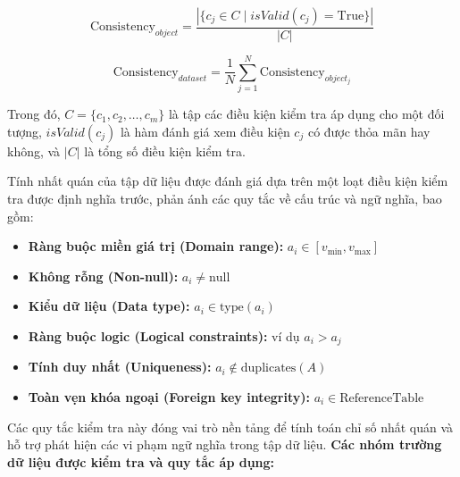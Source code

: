 \begin{equation}
\text{Consistency}_{object} = \frac{|\{ c_j \in C \mid isValid(c_j) = \text{True} \}|}{|C|}
\end{equation}

\begin{equation}
\text{Consistency}_{dataset} = \frac{1}{N} \sum_{j=1}^{N} \text{Consistency}_{object_j}
\end{equation}

Trong đó, $C = \{c_1, c_2, \ldots, c_m\}$ là tập các điều kiện kiểm tra áp dụng cho một đối tượng, $isValid(c_j)$ là hàm đánh giá xem điều kiện $c_j$ có được thỏa mãn hay không, và $|C|$ là tổng số điều kiện kiểm tra.

Tính nhất quán của tập dữ liệu được đánh giá dựa trên một loạt điều kiện kiểm tra được định nghĩa trước, phản ánh các quy tắc về cấu trúc và ngữ nghĩa, bao gồm:

\begin{itemize}
    \item \textbf{Ràng buộc miền giá trị (Domain range):} $a_i \in [v_{\text{min}}, v_{\text{max}}]$
    \item \textbf{Không rỗng (Non-null):} $a_i \neq \text{null}$
    \item \textbf{Kiểu dữ liệu (Data type):} $a_i \in \text{type}(a_i)$
    \item \textbf{Ràng buộc logic (Logical constraints):} ví dụ $a_i > a_j$
    \item \textbf{Tính duy nhất (Uniqueness):} $a_i \notin \text{duplicates}(A)$
    \item \textbf{Toàn vẹn khóa ngoại (Foreign key integrity):} $a_i \in \text{ReferenceTable}$
\end{itemize}

Các quy tắc kiểm tra này đóng vai trò nền tảng để tính toán chỉ số nhất quán và hỗ trợ phát hiện các vi phạm ngữ nghĩa trong tập dữ liệu. \textbf{Các nhóm trường dữ liệu được kiểm tra và quy tắc áp dụng:}

